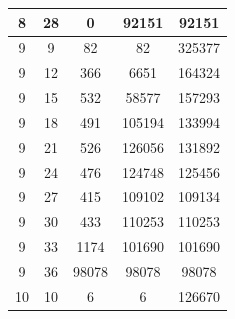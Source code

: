 \documentclass[a4paper,14pt]{extarticle}
\begin{document}
\begin{enumerate}[1.]
\begin{tabular}{|c|c|c|c|c|}
              \hline
              8                                  & 28                                & 0                                       & 92151         & 92151  \\
              \hline
              9                                  & 9                                 & 82                                      & 82            & 325377 \\
              \hline
              9                                  & 12                                & 366                                     & 6651          & 164324 \\
              \hline
              9                                  & 15                                & 532                                     & 58577         & 157293 \\
              \hline
              9                                  & 18                                & 491                                     & 105194        & 133994 \\
              \hline
              9                                  & 21                                & 526                                     & 126056        & 131892 \\
              \hline
              9                                  & 24                                & 476                                     & 124748        & 125456 \\
              \hline
              9                                  & 27                                & 415                                     & 109102        & 109134 \\
              \hline
              9                                  & 30                                & 433                                     & 110253        & 110253 \\
              \hline
              9                                  & 33                                & 1174                                    & 101690        & 101690 \\
              \hline
              9                                  & 36                                & 98078                                   & 98078         & 98078  \\
              \hline
              10                                 & 10                                & 6                                       & 6             & 126670 \\
              \hline

\end{tabular}
\end{enumerate}
\end{document}

